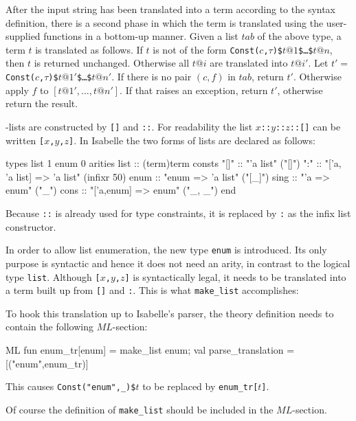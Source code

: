 After the input string has been translated into a term according to the
syntax definition, there is a second phase in which the term is translated
using the user-supplied functions in a bottom-up manner.  Given a list $tab$
of the above type, a term $t$ is translated as follows.  If $t$ is not of the
form {\tt Const($c$,$\tau$)\$$t@1$\$\dots\$$t@n$}, then $t$ is returned
unchanged.  Otherwise all $t@i$ are translated into $t@i'$.  Let {\tt $t' =$
  Const($c$,$\tau$)\$$t@1'$\$\dots\$$t@n'$}.  If there is no pair $(c,f)$ in
$tab$, return $t'$.  Otherwise apply $f$ to $[t@1',\dots,t@n']$.  If that
raises an exception, return $t'$, otherwise return the result.
\begin{example}\label{list-enum}
\ML-lists are constructed by {\tt[]} and {\tt::}.  For readability the
list \hbox{\tt$x$::$y$::$z$::[]} can be written \hbox{\tt[$x$,$y$,$z$]}.
In Isabelle the two forms of lists are declared as follows:
\begin{ttbox}
types list 1
      enum 0
arities list :: (term)term
consts "[]" :: "'a list"                   ("[]")
       ":"  :: "['a, 'a list] => 'a list"  (infixr 50)
       enum :: "enum => 'a list"           ("[_]")
       sing :: "'a => enum"                ("_")
       cons :: "['a,enum] => enum"         ("_, _")
end
\end{ttbox}
Because \verb$::$ is already used for type constraints, it is replaced by
\verb$:$ as the infix list constructor.

In order to allow list enumeration, the new type {\tt enum} is introduced.
Its only purpose is syntactic and hence it does not need an arity, in
contrast to the logical type {\tt list}.  Although \hbox{\tt[$x$,$y$,$z$]} is
syntactically legal, it needs to be translated into a term built up from
\verb$[]$ and \verb$:$.  This is what \verb$make_list$ accomplishes:
To hook this translation up to Isabelle's parser, the theory definition needs
to contain the following $ML$-section:
\begin{ttbox}
ML
fun enum_tr[enum] = make_list enum;
val parse_translation = [("enum",enum_tr)]
\end{ttbox}
This causes \verb!Const("enum",_)$!$t$ to be replaced by
\verb$enum_tr[$$t$\verb$]$.

Of course the definition of \verb$make_list$ should be included in the
$ML$-section.
\end{example}
